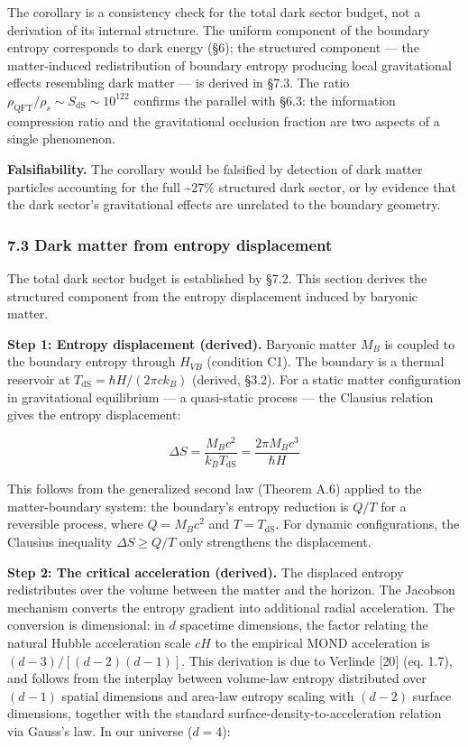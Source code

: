 \documentclass[
]{article}
\begin{document}
The corollary is a consistency check for the total dark sector budget,
not a derivation of its internal structure. The uniform component of the
boundary entropy corresponds to dark energy (§6); the structured
component --- the matter-induced redistribution of boundary entropy
producing local gravitational effects resembling dark matter --- is
derived in §7.3. The ratio
\(\rho_{\text{QFT}} / \rho_s \sim S_{\text{dS}} \sim 10^{122}\) confirms
the parallel with §6.3: the information compression ratio and the
gravitational occlusion fraction are two aspects of a single phenomenon.

\textbf{Falsifiability.} The corollary would be falsified by detection
of dark matter particles accounting for the full \textasciitilde27\%
structured dark sector, or by evidence that the dark sector's
gravitational effects are unrelated to the boundary geometry.

\hypertarget{dark-matter-from-entropy-displacement}{%
\subsubsection{7.3 Dark matter from entropy
displacement}\label{dark-matter-from-entropy-displacement}}

The total dark sector budget is established by §7.2. This section
derives the structured component from the entropy displacement induced
by baryonic matter.

\textbf{Step 1: Entropy displacement (derived).} Baryonic matter \(M_B\)
is coupled to the boundary entropy through \(H_{VB}\) (condition C1).
The boundary is a thermal reservoir at
\(T_{\text{dS}} = \hbar H / (2\pi c k_B)\) (derived, §3.2). For a static
matter configuration in gravitational equilibrium --- a quasi-static
process --- the Clausius relation gives the entropy displacement:

\[\Delta S = \frac{M_B c^2}{k_B T_{\text{dS}}} = \frac{2\pi M_B c^3}{\hbar H}\]

This follows from the generalized second law (Theorem A.6) applied to
the matter-boundary system: the boundary's entropy reduction is \(Q/T\)
for a reversible process, where \(Q = M_B c^2\) and
\(T = T_{\text{dS}}\). For dynamic configurations, the Clausius
inequality \(\Delta S \geq Q/T\) only strengthens the displacement.

\textbf{Step 2: The critical acceleration (derived).} The displaced
entropy redistributes over the volume between the matter and the
horizon. The Jacobson mechanism converts the entropy gradient into
additional radial acceleration. The conversion is dimensional: in \(d\)
spacetime dimensions, the factor relating the natural Hubble
acceleration scale \(cH\) to the empirical MOND acceleration is
\((d-3)/[(d-2)(d-1)]\). This derivation is due to Verlinde {[}20{]} (eq.
1.7), and follows from the interplay between volume-law entropy
distributed over \((d-1)\) spatial dimensions and area-law entropy
scaling with \((d-2)\) surface dimensions, together with the standard
surface-density-to-acceleration relation via Gauss's law. In our
universe (\(d = 4\)):
\end{document}

